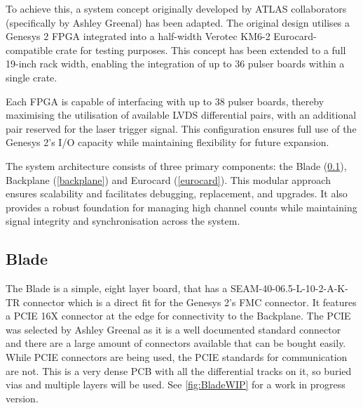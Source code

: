 \documentclass[a4paper,11pt]{article}
\begin{document}
To achieve this, a system concept originally developed by ATLAS collaborators (specifically by Ashley Greenal) has been adapted. The original design utilises a Genesys 2 FPGA integrated into a half-width Verotec KM6-2 \cite{KM6-2} Eurocard-compatible crate for testing purposes. This concept has been extended to a full 19-inch rack width, enabling the integration of up to 36 pulser boards within a single crate.

Each FPGA is capable of interfacing with up to 38 pulser boards, thereby maximising the utilisation of available LVDS differential pairs, with an additional pair reserved for the laser trigger signal. This configuration ensures full use of the Genesys 2’s I/O capacity while maintaining flexibility for future expansion.

The system architecture consists of three primary components: the Blade (\cref{blade}), Backplane (\cref{backplane}) and Eurocard (\cref{eurocard}). This modular approach ensures scalability and facilitates debugging, replacement, and upgrades. It also provides a robust foundation for managing high channel counts while maintaining signal integrity and synchronisation across the system.

\subsection{Blade}\label{blade}

The Blade is a simple, eight layer board, that has a SEAM-40-06.5-L-10-2-A-K-TR \cite{SamtecSeam} connector which is a direct fit for the Genesys 2's FMC connector. It features a PCIE 16X connector at the edge for connectivity to the Backplane. The PCIE was selected by Ashley Greenal as it is a well documented standard connector and there are a large amount of connectors available that can be bought easily. While PCIE connectors are being used, the PCIE standards for communication are not. This is a very dense PCB with all the differential tracks on it, so buried vias and multiple layers will be used. See \cref{fig:BladeWIP} for a work in progress version.
\end{document}
